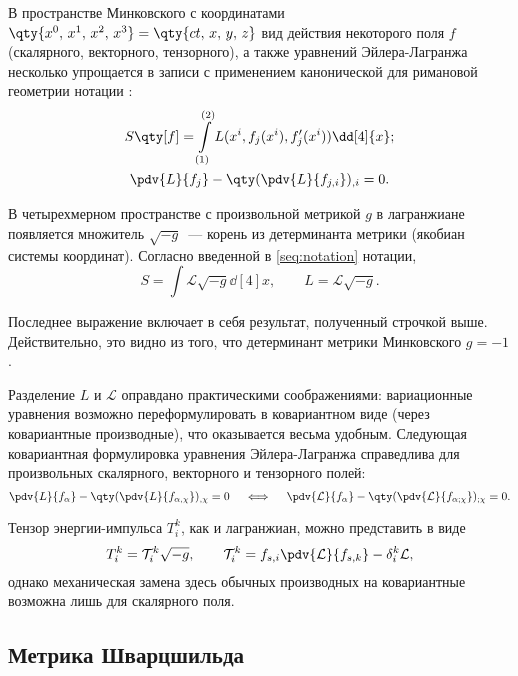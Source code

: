 \documentclass[\docroot/reports/draft/report.tex]{subfiles}
\begin{document}
    В пространстве Минковского с координатами $\qty{x^0,\,x^1,\,x^2,\,x^3} = \qty{ct,\,x,\,y,\,z}$ вид действия некоторого поля $f$ (скалярного, векторного, тензорного), а также уравнений Эйлера-Лагранжа несколько упрощается в записи с применением канонической для римановой геометрии нотации \cite{landau_v1,riemannian_geometry_and_tensor_analysis}:
    \begin{gather}
        S\qty[f] = \int\limits_{(1)}^{(2)} L(x^i, f_j(x^i), f'_j(x^i)) \dd[4]{x}; \\
        \pdv{L}{f_j} - \qty(\pdv{L}{f_{j,i}})_{,i} = 0 .
    \end{gather}

    В четырехмерном пространстве с произвольной метрикой $g$ в лагранжиане появляется множитель $\sqrt{-g}$~--- корень из детерминанта метрики (якобиан системы координат). Согласно введенной в \autoref{seq:notation} нотации,
    \begin{equation}
        S = \int \mathcal{L} \sqrt{-g}\dd[4]{x}, \qquad L = \mathcal{L} \sqrt{-g} .
    \end{equation}

    Последнее выражение включает в себя результат, полученный строчкой выше. Действительно, это видно из того, что детерминант метрики Минковского $g = -1$.

    Разделение $L$ и $\mathcal{L}$ оправдано практическими соображениями: вариационные уравнения возможно переформулировать в ковариантном виде (через ковариантные производные), что оказывается весьма удобным. Следующая ковариантная формулировка уравнения Эйлера-Лагранжа справедлива для произвольных скалярного, векторного и тензорного полей:
    \begin{equation*}
        \pdv{L}{f_{\alpha}} - \qty(\pdv{L}{f_{\alpha,\chi}})_{,\chi} = 0 \quad\iff\quad
        \pdv{\mathcal{L}}{f_{\alpha}} - \qty(\pdv{\mathcal{L}}{f_{\alpha;\chi}})_{;\chi} = 0 .
    \end{equation*}

    Тензор энергии-импульса $T_i^k$, как и лагранжиан, можно представить в виде
    \begin{equation}
        T_i^k = \mathcal{T}_i^k \sqrt{-g}, \qquad \mathcal{T}_i^k = f_{s,i} \pdv{\mathcal{L}}{f_{s,k}} - \delta_i^k \mathcal{L},
    \end{equation}
    однако механическая замена здесь обычных производных на ковариантные возможна лишь для скалярного поля.

\subsection{Метрика Шварцшильда}
\end{document}
